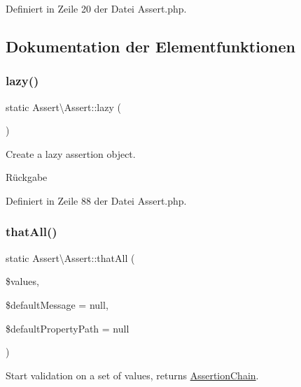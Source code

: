 Definiert in Zeile 20 der Datei Assert.\+php.



\subsection{Dokumentation der Elementfunktionen}
\mbox{\label{class_assert_1_1_assert_a265a6a9fcb274b0f93bc3cc2b28e3ebc}} 
\subsubsection{\texorpdfstring{lazy()}{lazy()}}
{\footnotesize\ttfamily static Assert\textbackslash{}\+Assert\+::lazy (\begin{DoxyParamCaption}{ }\end{DoxyParamCaption})\hspace{0.3cm}{\ttfamily [static]}}

Create a lazy assertion object.

\begin{DoxyReturn}{Rückgabe}

\end{DoxyReturn}


Definiert in Zeile 88 der Datei Assert.\+php.

\mbox{\label{class_assert_1_1_assert_a699aef30afb1fbc83d2ddf21e0342c8f}} 
\subsubsection{\texorpdfstring{that\+All()}{thatAll()}}
{\footnotesize\ttfamily static Assert\textbackslash{}\+Assert\+::that\+All (\begin{DoxyParamCaption}\item[{}]{\$values,  }\item[{}]{\$default\+Message = {\ttfamily null},  }\item[{}]{\$default\+Property\+Path = {\ttfamily null} }\end{DoxyParamCaption})\hspace{0.3cm}{\ttfamily [static]}}

Start validation on a set of values, returns \mbox{\hyperlink{class_assert_1_1_assertion_chain}{Assertion\+Chain}}.


